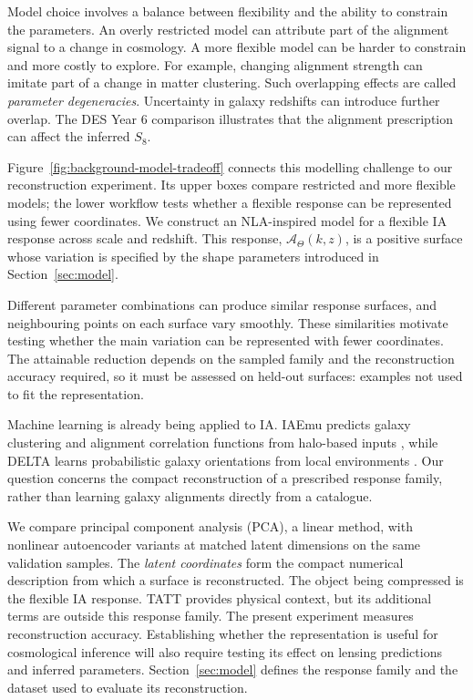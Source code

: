 Model choice involves a balance between flexibility and the ability to
constrain the parameters. An overly restricted model can attribute part of
the alignment signal to a change in cosmology. A more flexible model can be
harder to constrain and more costly to explore. For example, changing
alignment strength can imitate part of a change in matter clustering.
Such overlapping effects are called \emph{parameter degeneracies}.
Uncertainty in galaxy redshifts can introduce further overlap.
The DES Year 6 comparison \citep{2026arXiv260210065D} illustrates that the
alignment prescription can affect the inferred $S_8$.

Figure~\ref{fig:background-model-tradeoff} connects this modelling challenge
to our reconstruction experiment. Its upper boxes compare restricted and
more flexible models; the lower workflow tests whether a flexible response
can be represented using fewer coordinates. We construct an NLA-inspired
model for a flexible IA response across scale and redshift. This response,
$\mathcal A_\Theta(k,z)$, is a positive surface whose variation is specified
by the shape parameters introduced in Section~\ref{sec:model}.

Different parameter combinations can produce similar response surfaces,
and neighbouring points on each surface vary smoothly. These similarities
motivate testing whether the main variation can be represented with fewer
coordinates. The attainable reduction depends on the sampled family and
the reconstruction accuracy required, so it must be assessed on held-out
surfaces: examples not used to fit the representation.

Machine learning is already being applied to IA. IAEmu predicts galaxy
clustering and alignment correlation functions from halo-based inputs
\citep{Pandya2025}, while DELTA learns probabilistic galaxy orientations
from local environments \citep{Craigie2025}. Our question concerns the
compact reconstruction of a prescribed response family, rather than
learning galaxy alignments directly from a catalogue.

We compare principal component analysis (PCA), a linear method, with
nonlinear autoencoder variants at matched latent dimensions on the same
validation samples. The \emph{latent coordinates} form the compact
numerical description from which a surface is reconstructed. The object
being compressed is the flexible IA response. TATT provides physical
context, but its additional terms are outside this response family.
The present experiment measures reconstruction accuracy. Establishing
whether the representation is useful for cosmological inference will also
require testing its effect on lensing predictions and inferred parameters.
Section~\ref{sec:model} defines the response family and the dataset used
to evaluate its reconstruction.
